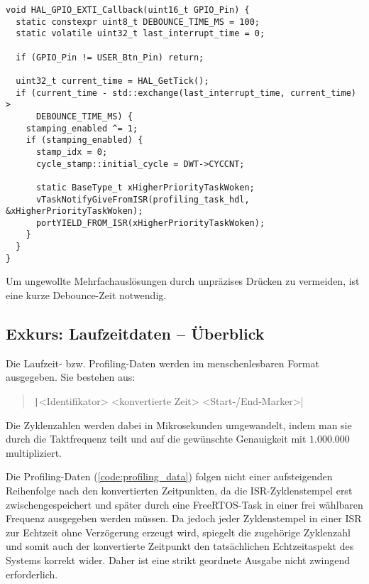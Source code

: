 \begin{code}
\begin{verbatim}
void HAL_GPIO_EXTI_Callback(uint16_t GPIO_Pin) {
  static constexpr uint8_t DEBOUNCE_TIME_MS = 100;
  static volatile uint32_t last_interrupt_time = 0;

  if (GPIO_Pin != USER_Btn_Pin) return;

  uint32_t current_time = HAL_GetTick();
  if (current_time - std::exchange(last_interrupt_time, current_time) >
      DEBOUNCE_TIME_MS) {
    stamping_enabled ^= 1;
    if (stamping_enabled) {
      stamp_idx = 0;
      cycle_stamp::initial_cycle = DWT->CYCCNT;

      static BaseType_t xHigherPriorityTaskWoken;
      vTaskNotifyGiveFromISR(profiling_task_hdl, &xHigherPriorityTaskWoken);
      portYIELD_FROM_ISR(xHigherPriorityTaskWoken);
    }
  }
}
\end{verbatim}
    \label{code:btn_irq}
\end{code}

Um ungewollte Mehrfachauslösungen durch unpräzises Drücken zu vermeiden, ist
eine kurze Debounce-Zeit notwendig.

\subsection{Exkurs: Laufzeitdaten -- Überblick}

Die Laufzeit- bzw. Profiling-Daten werden im menschenlesbaren Format ausgegeben.
Sie bestehen aus:

\begin{quote}
    \texttt|<Identifikator> <konvertierte Zeit> <Start-/End-Marker>|
\end{quote}

Die Zyklenzahlen werden dabei in Mikrosekunden umgewandelt, indem man sie durch
die Taktfrequenz teilt und auf die gewünschte Genauigkeit mit $1.000.000$
multipliziert.

Die Profiling-Daten (\ref{code:profiling_data}) folgen nicht einer aufsteigenden
Reihenfolge nach den konvertierten Zeitpunkten, da die ISR-Zyklenstempel erst
zwischengespeichert und später durch eine FreeRTOS-Task in einer frei wählbaren
Frequenz ausgegeben werden müssen. Da jedoch jeder Zyklenstempel in einer ISR
zur Echtzeit ohne Verzögerung erzeugt wird, spiegelt die zugehörige Zyklenzahl
und somit auch der konvertierte Zeitpunkt den tatsächlichen Echtzeitaspekt des
Systems korrekt wider. Daher ist eine strikt geordnete Ausgabe nicht zwingend
erforderlich.

